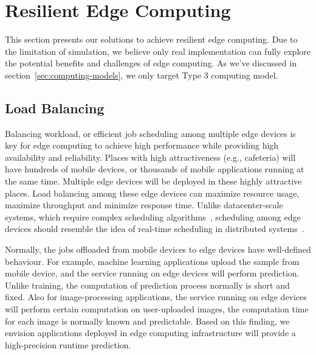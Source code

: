 \section{Resilient Edge Computing}
\label{sec:resilient-egde}

This section presents our solutions to achieve resilient edge computing.
Due to the limitation of simulation, we believe only real implementation can
fully explore the potential benefits and challenges of edge computing.
As we've discussed in section~\ref{sec:computing-models}, we only target Type 3 computing model.

\subsection{Load Balancing}
\label{sec:load-balancing}
Balancing workload, or efficient job scheduling among multiple edge devices is key for edge computing
to achieve high performance while providing high availability and reliability.
Places with high attractiveness (e.g., cafeteria) will have hundreds of mobile devices,
or thousands of mobile applications running at the same time. Multiple edge devices
will be deployed in these highly attractive places. Load balancing among these
edge devices can maximize resource usage, maximize throughput and minimize response time.
Unlike datacenter-scale systems, which require complex scheduling algorithms~\cite{DRF-NSDI11,Borg-Eurosys15},
scheduling among edge devices should resemble the idea of real-time scheduling in distributed systems~\cite{rt-sched98}.

Normally, the jobs offloaded from mobile devices to edge devices have well-defined behaviour.
For example, machine learning applications upload the sample from mobile device, and the
service running on edge devices will perform prediction. Unlike training, the computation
of prediction process normally is short and fixed. Also for image-processing applications, the
service running on edge devices will perform certain computation on user-uploaded images, the
computation time for each image is normally known and predictable. Based on this finding,
we envision applications deployed in edge computing infrastructure will provide a high-precision runtime prediction.

